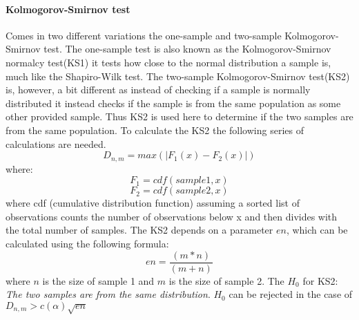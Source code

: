 \paragraph{Kolmogorov-Smirnov test}
Comes in two different variations the one-sample and two-sample Kolmogorov-Smirnov test. The one-sample test is also known as the Kolmogorov-Smirnov normalcy test(KS1) it tests how close to the normal distribution a sample is, much like the Shapiro-Wilk test. The two-sample Kolmogorov-Smirnov test(KS2) is, however, a bit different as instead of checking if a sample is normally distributed it instead checks if the sample is from the same population as some other provided sample. Thus KS2 is used here to determine if the two samples are from the same population. To calculate the KS2 the following series of calculations are needed.
$$D_{n,m} = max(|F_1(x)-F_2(x)|)$$
where:
$$F_1 = cdf(sample1,x)$$
$$F_2 = cdf(sample2,x)$$
where cdf (cumulative distribution function) assuming a sorted list of observations counts the number of observations below x and then divides with the total number of samples. The KS2 depends on a parameter $en$, which can be calculated using the following formula:
$$en=\frac{(m*n)}{(m+n)}$$
where $n$ is the size of sample 1 and $m$ is the size of sample 2.
The $H_0$ for KS2: \textit{The two samples are from the same distribution}.
$H_0$ can be rejected in the case of $D_{n,m} > c(\alpha)\sqrt{en}$\cite{massey1951kolmogorov}
